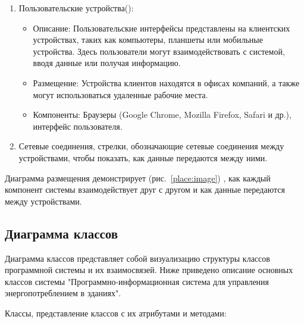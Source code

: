 \begin{enumerate}
\item Пользовательские устройства():
\begin{itemize}
	\item {Описание:} Пользовательские интерфейсы представлены на клиентских устройствах, таких как компьютеры, планшеты или мобильные устройства. Здесь пользователи могут взаимодействовать с системой, вводя данные или получая информацию.
	\item {Размещение:} Устройства клиентов находятся в офисах компаний, а также могут использоваться удаленные рабочие места.
	\item {Компоненты:} Браузеры (Google Chrome, Mozilla Firefox, Safari и др.), интерфейс пользователя.
\end{itemize}


\item Сетевые соединения, стрелки, обозначающие сетевые соединения между устройствами, чтобы показать, как данные передаются между ними.


\end{enumerate}

Диаграмма размещения демонстрирует (рис.~\ref{place:image}) , как каждый компонент системы взаимодействует друг с другом и как данные передаются между устройствами.





\subsection{Диаграмма классов}

Диаграмма классов представляет собой визуализацию структуры классов программной системы и их взаимосвязей. Ниже приведено описание основных классов системы "Программно-информационная система для управления энергопотреблением в зданиях".

Классы, представление классов с их атрибутами и методами:


